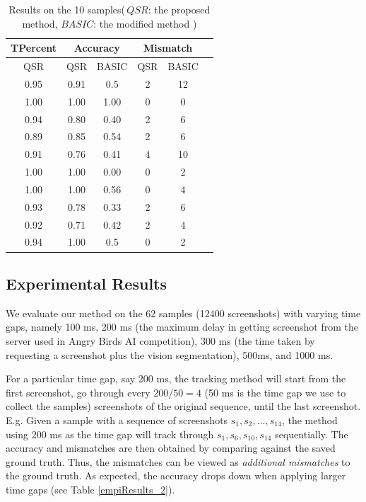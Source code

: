 \documentclass[letterpaper]{article}
\begin{document}
\begin{table}[h!]
\caption{Results on the 10 samples(\,$QSR$: the proposed method, $BASIC$: the modified method )}\label{empiResults}
\centering
\begin{tabular}{c|c|c|c|c|c}
\hline
{TPercent} & \multicolumn{2}{c}{Accuracy} & \multicolumn{2}{c}{Mismatch}\\
\hline
QSR  & QSR & BASIC & QSR & BASIC\\
\hline
0.95& 0.91 & 0.5 & 2 & 12\\
1.00&1.00 & 1.00 & 0 & 0\\
0.94&0.80 & 0.40 & 2 & 6\\
0.89&0.85 & 0.54 & 2 & 6\\
0.91&0.76 & 0.41 & 4 & 10\\
1.00&1.00 & 0.00 & 0 & 2\\
1.00&1.00 & 0.56 & 0 & 4\\
0.93&0.78 & 0.33 & 2 & 6 \\
0.92&0.71 & 0.42 & 2 & 4\\
0.94&1.00 & 0.5 & 0 & 2\\
\hline
\end{tabular}
\end{table}

\subsection{Experimental Results}

We evaluate our method on the 62 samples (12400 screenshots) with varying time gaps, namely 100 ms, 200 ms (the maximum delay in getting screenshot from the server used in Angry Birds AI competition), 300 ms (the time taken by requesting a screenshot plus the vision segmentation), 500ms, and 1000 ms.

For a particular time gap, say 200 ms, the tracking method will start from the first screenshot, go through every $200/50 = 4$ (50 ms is the time gap we use to collect the samples) screenshots of the original sequence, until the last screenshot. E.g. Given a sample with a sequence of screenshots $s_1, s_2, ..., s_{14}$, the method using 200 ms as the time gap will track through $s_1, s_6, s_{10}, s_{14}$ sequentially. The accuracy and mismatches are then obtained by comparing against the saved ground truth. Thus, the mismatches can be viewed as \emph{additional mismatches} to the ground truth. As expected, the accuracy drops down when applying larger time gaps (see Table \ref{empiResults_2}). 
\end{document}
